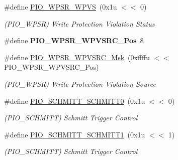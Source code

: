 \begin{DoxyCompactItemize}
\#define \mbox{\hyperlink{group__SAME70__PIO_gab2743f8c6f0577c266f990cdd41b1c47}{P\+I\+O\+\_\+\+W\+P\+S\+R\+\_\+\+W\+P\+VS}}~(0x1u $<$$<$ 0)
\begin{DoxyCompactList}\small\item\em (P\+I\+O\+\_\+\+W\+P\+SR) Write Protection Violation Status \end{DoxyCompactList}\item 
\mbox{\label{group__SAME70__PIO_gafb016684495c4d9ca79588b692dcce8a}} 
\#define {\bfseries P\+I\+O\+\_\+\+W\+P\+S\+R\+\_\+\+W\+P\+V\+S\+R\+C\+\_\+\+Pos}~8
\item 
\mbox{\label{group__SAME70__PIO_gacc9b2ff45ba388215533d56205d5357a}} 
\#define \mbox{\hyperlink{group__SAME70__PIO_gacc9b2ff45ba388215533d56205d5357a}{P\+I\+O\+\_\+\+W\+P\+S\+R\+\_\+\+W\+P\+V\+S\+R\+C\+\_\+\+Msk}}~(0xffffu $<$$<$ P\+I\+O\+\_\+\+W\+P\+S\+R\+\_\+\+W\+P\+V\+S\+R\+C\+\_\+\+Pos)
\begin{DoxyCompactList}\small\item\em (P\+I\+O\+\_\+\+W\+P\+SR) Write Protection Violation Source \end{DoxyCompactList}\item 
\mbox{\label{group__SAME70__PIO_gaab5c0e749fba5a69a23b982d0df495a8}} 
\#define \mbox{\hyperlink{group__SAME70__PIO_gaab5c0e749fba5a69a23b982d0df495a8}{P\+I\+O\+\_\+\+S\+C\+H\+M\+I\+T\+T\+\_\+\+S\+C\+H\+M\+I\+T\+T0}}~(0x1u $<$$<$ 0)
\begin{DoxyCompactList}\small\item\em (P\+I\+O\+\_\+\+S\+C\+H\+M\+I\+TT) Schmitt Trigger Control \end{DoxyCompactList}\item 
\mbox{\label{group__SAME70__PIO_ga801925c1df838dbcd14c6bd6cc2858c3}} 
\#define \mbox{\hyperlink{group__SAME70__PIO_ga801925c1df838dbcd14c6bd6cc2858c3}{P\+I\+O\+\_\+\+S\+C\+H\+M\+I\+T\+T\+\_\+\+S\+C\+H\+M\+I\+T\+T1}}~(0x1u $<$$<$ 1)
\begin{DoxyCompactList}\small\item\em (P\+I\+O\+\_\+\+S\+C\+H\+M\+I\+TT) Schmitt Trigger Control \end{DoxyCompactList}\item 
\mbox{\label{group__SAME70__PIO_gad694f48d35253a97f0130c266a3ef205}} 

\end{DoxyCompactItemize}
